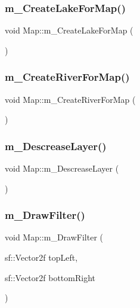 \mbox{\label{class_map_a8d88a513b07b30ebd5e0a94ad6537e8b}} 
\subsubsection{\texorpdfstring{m\+\_\+\+Create\+Lake\+For\+Map()}{m\_CreateLakeForMap()}}
{\footnotesize\ttfamily void Map\+::m\+\_\+\+Create\+Lake\+For\+Map (\begin{DoxyParamCaption}{ }\end{DoxyParamCaption})}

\mbox{\label{class_map_a0fbb42a352131e4815bef949fdcd36d3}} 
\subsubsection{\texorpdfstring{m\+\_\+\+Create\+River\+For\+Map()}{m\_CreateRiverForMap()}}
{\footnotesize\ttfamily void Map\+::m\+\_\+\+Create\+River\+For\+Map (\begin{DoxyParamCaption}{ }\end{DoxyParamCaption})}

\mbox{\label{class_map_a59ab8311c6ea6ca42b00ae7e1ec2c10e}} 
\subsubsection{\texorpdfstring{m\+\_\+\+Descrease\+Layer()}{m\_DescreaseLayer()}}
{\footnotesize\ttfamily void Map\+::m\+\_\+\+Descrease\+Layer (\begin{DoxyParamCaption}{ }\end{DoxyParamCaption})}

\mbox{\label{class_map_a47f69ae4c316d2efe45bd8a066e982c9}} 
\subsubsection{\texorpdfstring{m\+\_\+\+Draw\+Filter()}{m\_DrawFilter()}}
{\footnotesize\ttfamily void Map\+::m\+\_\+\+Draw\+Filter (\begin{DoxyParamCaption}\item[{sf\+::\+Vector2f}]{top\+Left,  }\item[{sf\+::\+Vector2f}]{bottom\+Right }\end{DoxyParamCaption})\hspace{0.3cm}{\ttfamily [virtual]}}



